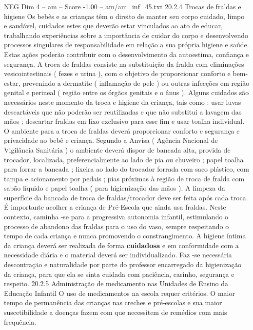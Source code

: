 \begin{textsample}{NEG Dim 4 – am – Score -1.00 – am/am\_inf\_45.txt}  \label{ex:f4_neg_189}
20.2.4 Trocas de fraldas e higiene Os bebês e as crianças têm o direito de manter seu corpo cuidado, limpo e saudável, cuidados estes que deverão estar vinculados ao ato de educar, trabalhando experiências sobre a importância de cuidar do corpo e desenvolvendo processos singulares de responsabilidade em relação a sua própria higiene e saúde.
Estas ações poderão contribuir com o desenvolvimento da autoestima, confiança e segurança.
A troca de fraldas consiste na substituição da fralda com eliminações vesicointestinais ( fezes e urina ), com o objetivo de proporcionar conforto e bem-estar, prevenindo a dermatite ( inflamação de pele ) ou outras infecções em região genital e perineal ( região entre os órgãos genitais e o ânus ).
Alguns cuidados são necessários neste momento da troca e higiene da criança, tais como : usar luvas descartáveis que não poderão ser reutilizadas e que não substitui a lavagem das mãos ; descartar fraldas em lixo exclusivo para esse fim e usar toalha individual.
O ambiente para a troca de fraldas deverá proporcionar conforto e segurança e privacidade ao bebê e criança.
Segundo a Anvisa ( Agência Nacional de Vigilância Sanitária ) o ambiente deverá dispor de bancada alta, provida de trocador, localizada, preferencialmente ao lado de pia ou chuveiro ; papel toalha para forrar a bancada ; lixeira ao lado do trocador forrada com saco plástico, com tampa e acionamento por pedais ; pias próximas à região de troca de fralda com sabão líquido e papel toalha ( para higienização das mãos ).
A limpeza da superfície da bancada de troca de fraldas/trocador deve ser feita após cada troca.
É importante acolher a criança de Pré-Escola que ainda usa fraldas.
Neste contexto, caminha -se para a progressiva autonomia infantil, estimulando o processo de abandono das fraldas para o uso do vaso, sempre respeitando o tempo de cada criança e nunca promovendo o constrangimento.
A higiene íntima da criança deverá ser realizada de forma \textbf{cuidadosa} e em conformidade com a necessidade diária e o material deverá ser individualizado.
Faz -se necessária descontração e naturalidade por parte do professor encarregado da higienização da criança, para que ela se sinta cuidada com paciência, carinho, segurança e respeito. 20.2.5 Administração de medicamento nas Unidades de Ensino da Educação Infantil O uso de medicamentos na escola requer critérios.
O maior tempo de permanência das crianças nas creches e pré-escolas e sua maior suscetibilidade a doenças fazem com que necessitem de remédios com mais frequência.

\end{textsample}
